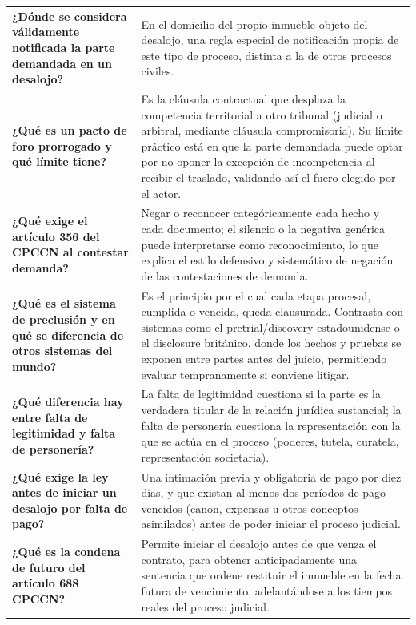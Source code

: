 \documentclass[12pt,oneside]{book}
\begin{document}
\begin{longtable}{
    >{\raggedright\arraybackslash}p{}
    >{\raggedright\arraybackslash}p{}
}
\textbf{¿Dónde se considera válidamente notificada la parte demandada en un desalojo?} &
En el domicilio del propio inmueble objeto del desalojo, una regla especial de notificación propia de este tipo de proceso, distinta a la de otros procesos civiles. \\

\textbf{¿Qué es un pacto de foro prorrogado y qué límite tiene?} &
Es la cláusula contractual que desplaza la competencia territorial a otro tribunal (judicial o arbitral, mediante cláusula compromisoria). Su límite práctico está en que la parte demandada puede optar por no oponer la excepción de incompetencia al recibir el traslado, validando así el fuero elegido por el actor. \\

\textbf{¿Qué exige el artículo 356 del CPCCN al contestar demanda?} &
Negar o reconocer categóricamente cada hecho y cada documento; el silencio o la negativa genérica puede interpretarse como reconocimiento, lo que explica el estilo defensivo y sistemático de negación de las contestaciones de demanda. \\

\textbf{¿Qué es el sistema de preclusión y en qué se diferencia de otros sistemas del mundo?} &
Es el principio por el cual cada etapa procesal, cumplida o vencida, queda clausurada. Contrasta con sistemas como el pretrial/discovery estadounidense o el disclosure británico, donde los hechos y pruebas se exponen entre partes antes del juicio, permitiendo evaluar tempranamente si conviene litigar. \\

\textbf{¿Qué diferencia hay entre falta de legitimidad y falta de personería?} &
La falta de legitimidad cuestiona si la parte es la verdadera titular de la relación jurídica sustancial; la falta de personería cuestiona la representación con la que se actúa en el proceso (poderes, tutela, curatela, representación societaria). \\

\textbf{¿Qué exige la ley antes de iniciar un desalojo por falta de pago?} &
Una intimación previa y obligatoria de pago por diez días, y que existan al menos dos períodos de pago vencidos (canon, expensas u otros conceptos asimilados) antes de poder iniciar el proceso judicial. \\

\textbf{¿Qué es la condena de futuro del artículo 688 CPCCN?} &
Permite iniciar el desalojo antes de que venza el contrato, para obtener anticipadamente una sentencia que ordene restituir el inmueble en la fecha futura de vencimiento, adelantándose a los tiempos reales del proceso judicial. \\


\end{longtable}
\end{document}
